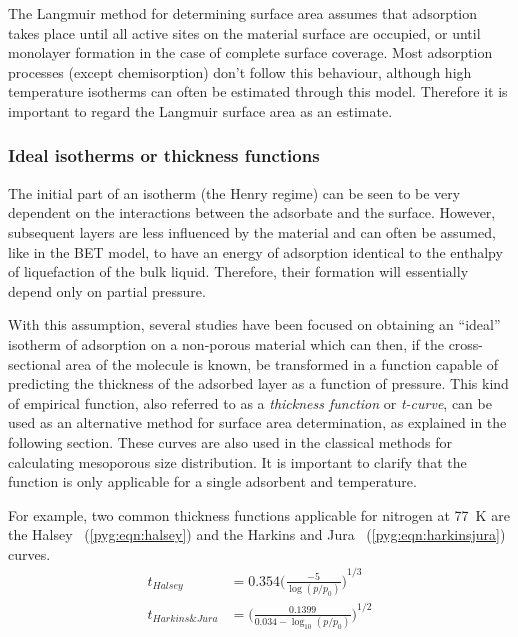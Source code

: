 The Langmuir method for determining surface area assumes that
adsorption takes place until all active sites on the material
surface are occupied, or until monolayer formation in the
case of complete surface coverage. Most adsorption processes
(except chemisorption) don't follow this behaviour, although 
high temperature isotherms can often be estimated through this 
model. Therefore it is important to regard the Langmuir surface 
area as an estimate.

\subsubsection{Ideal isotherms or thickness functions}\label{pyg:charac:tcurve}

The initial part of an isotherm (the Henry regime) can be seen to
be very dependent on the interactions between the adsorbate and the
surface. However, subsequent layers are less influenced by the
material and can often be assumed, like in the \gls{BET} model,
to have an energy of adsorption identical to the enthalpy of liquefaction
of the bulk liquid. Therefore, their formation will essentially depend
only on partial pressure.

With this assumption, several studies have been focused on obtaining
an ``ideal'' isotherm of adsorption on a non-porous material which can
then, if the cross-sectional area of the molecule is known, be transformed
in a function capable of predicting the thickness of the adsorbed layer
as a function of pressure. This kind of empirical function,
also referred to as a \textit{thickness function} or \textit{t-curve},
can be used as an alternative method for surface area determination,
as explained in the following section.
These curves are also used in the classical methods
for calculating mesoporous size distribution. It is important to
clarify that the function is only applicable for a single adsorbent
and temperature.

For example, two common thickness functions applicable for nitrogen
at \SI{77}{\kelvin} are the Halsey~\cite{halseyPhysicalAdsorptionNon1948}
(\autoref{pyg:eqn:halsey}) and the
Harkins and Jura~\cite{harkinsSurfacesSolidsXIII1944}
(\autoref{pyg:eqn:harkinsjura}) curves.
%
\begin{align}
	t_{Halsey}        & = 0.354 {\Big(\frac{-5}{\log(p/p_0)}\Big)}^{1/3}            %
	\label{pyg:eqn:halsey}                                                          \\
	t_{Harkins\&Jura} & = {\Big(\frac{0.1399}{0.034 - \log_{10}(p/p_0)}\Big)}^{1/2} %
	\label{pyg:eqn:harkinsjura}
\end{align}

